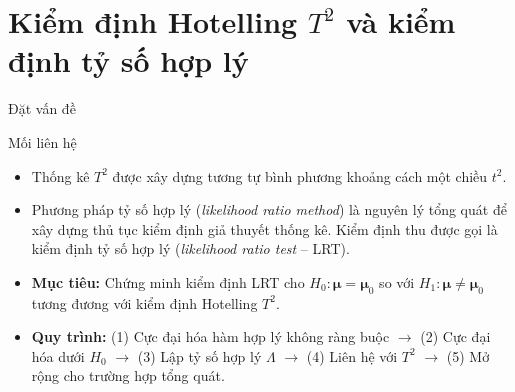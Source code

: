 
\section{Kiểm định Hotelling \texorpdfstring{\(T^2\)}{T2} và kiểm định tỷ số hợp lý}


\begin{frame}{Đặt vấn đề}

  \begin{block}{Mối liên hệ}

    \begin{itemize}
      \setlength{\itemsep}{8pt}

      \item Thống kê $T^2$ được xây dựng tương tự bình phương khoảng cách một chiều $t^2$.

      \item Phương pháp tỷ số hợp lý (\emph{likelihood ratio method}) là nguyên lý tổng quát để xây dựng thủ tục kiểm định giả thuyết thống kê. Kiểm định thu được gọi là kiểm định tỷ số hợp lý (\emph{likelihood ratio test} -- LRT).

      \item \textbf{Mục tiêu:} Chứng minh kiểm định LRT cho
      $H_0:\boldsymbol{\mu}=\boldsymbol{\mu}_0$ so với
      $H_1:\boldsymbol{\mu}\neq\boldsymbol{\mu}_0$
      tương đương với kiểm định Hotelling $T^2$.

      \item \textbf{Quy trình:}
      (1) Cực đại hóa hàm hợp lý không ràng buộc
      $\rightarrow$ (2) Cực đại hóa dưới $H_0$
      $\rightarrow$ (3) Lập tỷ số hợp lý $\Lambda$
      $\rightarrow$ (4) Liên hệ với $T^2$
      $\rightarrow$ (5) Mở rộng cho trường hợp tổng quát.

    \end{itemize}

  \end{block}

\end{frame}


